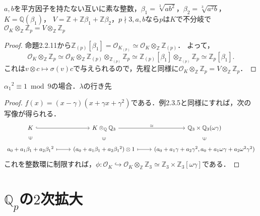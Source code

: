 \begin{screen}
  $a, b$を平方因子を持たない互いに素な整数，$\beta_1=\sqrt[3]{ab^2}$，$\beta_2=\sqrt[3]{a^2b}$，$K=\mathbb{Q}(\beta_1)$，
  $V=\mathbb{Z}+\mathbb{Z}\beta_1+\mathbb{Z}\beta_2$，$p\nmid3, a, b$なら$p$は$K$で不分岐で$\mathcal{O}_K\otimes_\mathbb{Z}\mathbb{Z}_p = V\otimes_\mathbb{Z}\mathbb{Z}_p$
\end{screen}
\begin{proof}
  命題2.2.11から$\mathbb{Z}_{(p)}[\beta_1]=\mathcal{O}_{K_{(p)}}\simeq\mathcal{O}_K\otimes_\mathbb{Z}\mathbb{Z}_{(p)}$．
  よって，
  \[\mathcal{O}_K\otimes_\mathbb{Z}\mathbb{Z}_p\simeq\mathcal{O}_K\otimes_\mathbb{Z}\mathbb{Z}_{(p)}\otimes_{\mathbb{Z}_{(p)}}\mathbb{Z}_p\simeq\mathbb{Z}_{(p)}[\beta_1]\otimes_{\mathbb{Z}_{(p)}}\mathbb{Z}_p\simeq\mathbb{Z}_p[\beta_1].\]
  これは$v \otimes c \mapsto \sigma(v)c$で与えられるので，先程と同様に$\mathcal{O}_K\otimes_\mathbb{Z}\mathbb{Z}_p = V\otimes_\mathbb{Z}\mathbb{Z}_p$．
\end{proof}

\begin{screen}
  $\alpha_1{}^2 \equiv 1 \bmod 9$の場合．$\lambda$の行き先
\end{screen}
\begin{proof}
  $f(x) = (x - \gamma)(x + \gamma x + \gamma^2)$である．例2.3.5と同様にすれば，次の写像が得られる．
  \[
  \begin{tikzcd}
    K \arrow[r, hookrightarrow]\arrow[d, phantom, "\ni" sloped] & K \otimes_\mathbb{Q} \mathbb{Q}_3 \arrow[r, "\simeq"]\arrow[d, phantom, "\ni" sloped] & \mathbb{Q}_3 \times \mathbb{Q}_3(\omega\gamma) \arrow[d, phantom, "\ni" sloped] \\
    a_0 + a_1 \beta_1 + a_2 \beta_1{}^2 \arrow[r, mapsto] & (a_0 + a_1 \beta_1 + a_2 \beta_1{}^2) \otimes 1 \arrow[r, mapsto] & (a_0 + a_1 \gamma + a_2 \gamma^2, a_0 + a_1 \omega\gamma + a_2 \omega^2\gamma^2)
  \end{tikzcd}
  \]
  これを整数環に制限すれば，$\phi \colon \mathcal{O}_K \hookrightarrow \mathcal{O}_K \otimes_\mathbb{Z} \mathbb{Z}_3 \simeq \mathbb{Z}_3 \times \mathbb{Z}_3[\omega\gamma]$である．
\end{proof}

\section{$\mathbb{Q}_p$の$2$次拡大}
